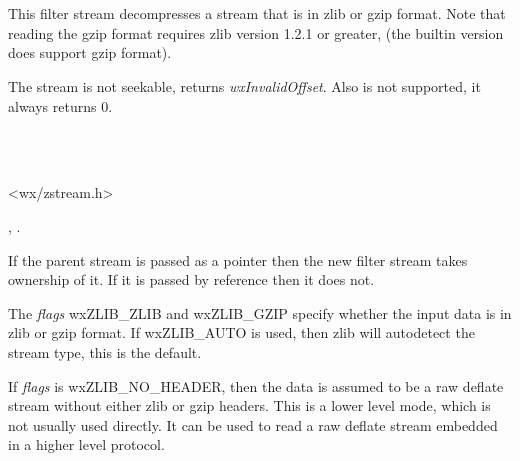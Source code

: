 \section{}\label{wxzlibinputstream}

This filter stream decompresses a stream that is in zlib or gzip format.
Note that reading the gzip format requires zlib version 1.2.1 or greater,
(the builtin version does support gzip format).

The stream is not seekable,  returns
 {\it wxInvalidOffset}. Also  is
not supported, it always returns $0$.


\\
\\


<wx/zstream.h>




, 
 .


\label{wxzlibinputstreamwxzlibinputstream}



If the parent stream is passed as a pointer then the new filter stream
takes ownership of it. If it is passed by reference then it does not.

The {\it flags} wxZLIB\_ZLIB and wxZLIB\_GZIP specify whether the input data
is in zlib or gzip format. If wxZLIB\_AUTO is used, then zlib will
autodetect the stream type, this is the default.

If {\it flags} is wxZLIB\_NO\_HEADER, then the data is assumed to be a raw
deflate stream without either zlib or gzip headers. This is a lower level
mode, which is not usually used directly. It can be used to read a raw
deflate stream embedded in a higher level protocol.

